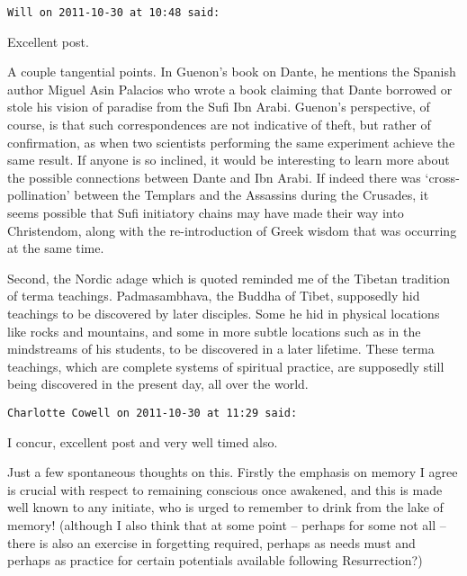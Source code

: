\begin{footnotesize}\begin{sffamily}

\texttt{Will on 2011-10-30 at 10:48 said:}

Excellent post.

A couple tangential points. In Guenon's book on Dante, he mentions the Spanish author Miguel Asin Palacios who wrote a book claiming that Dante borrowed or stole his vision of paradise from the Sufi Ibn Arabi. Guenon's perspective, of course, is that such correspondences are not indicative of theft, but rather of confirmation, as when two scientists performing the same experiment achieve the same result. If anyone is so inclined, it would be interesting to learn more about the possible connections between Dante and Ibn Arabi. If indeed there was `cross-pollination' between the Templars and the Assassins during the Crusades, it seems possible that Sufi initiatory chains may have made their way into Christendom, along with the re-introduction of Greek wisdom that was occurring at the same time.

Second, the Nordic adage which is quoted reminded me of the Tibetan tradition of terma teachings. Padmasambhava, the Buddha of Tibet, supposedly hid teachings to be discovered by later disciples. Some he hid in physical locations like rocks and mountains, and some in more subtle locations such as in the mindstreams of his students, to be discovered in a later lifetime. These terma teachings, which are complete systems of spiritual practice, are supposedly still being discovered in the present day, all over the world.

\hfill

\texttt{Charlotte Cowell on 2011-10-30 at 11:29 said:}

I concur, excellent post and very well timed also.

Just a few spontaneous thoughts on this. Firstly the emphasis on memory I agree is crucial with respect to remaining conscious once awakened, and this is made well known to any initiate, who is urged to remember to drink from the lake of memory! (although I also think that at some point – perhaps for some not all – there is also an exercise in forgetting required, perhaps as needs must and perhaps as practice for certain potentials available following Resurrection?)


\end{sffamily}
\end{footnotesize}
